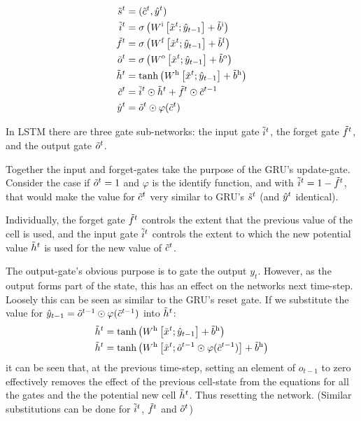 \documentclass[12pt,parskip]{komatufte}
\begin{document}
\begin{align}
\nv s_t &= (\nv c_t, \n \hat{y}_t)\\
%
\nv i_t &= \sigma \left( \d W_i \left[\nv x_t; \hat{y}_{t-1}\right] + \dv b_i \right) \\
\nv f_t &= \sigma \left( \d W_f\left[\nv x_t; \hat{y}_{t-1}\right] + \dv b_f \right) \\
\nv o_t &= \sigma \left( \d W_o\left[\nv x_t; \hat{y}_{t-1}\right] + \dv b_o \right) \\
%
\nv h_t &= \tanh \left( \d W_h\left[\nv x_t; \hat{y}_{t-1}\right] + \dv b_h \right) \\
\nv c_t &=  \nv i_t\odot \nv h_t + \nv f_t \odot \nv c_{t-1} \\
\n \hat{y}_t &= \nv o_t \odot \varphi(\nv c_t)
\end{align}



In LSTM there are three gate sub-networks:
the input gate $\nv i_t$, the forget gate $\nv f_t$, and the output gate $\nv o_t$.

Together the input and forget-gates take the purpose of the GRU's update-gate.
Consider the case if $\nv o_t=1$ and $\varphi$ is the identify function,
and with $\nv i_t=1-\nv f_t$, that would make the value for $\nv c_t$ very similar to GRU's $\nv s_t$ (and $\n \hat{y}_t$ identical).


Individually, the forget gate $\nv f_t$ controls the extent that the previous value of the cell is used,
and the input gate $\nv i_t$ controls the extent to which the new potential value $\nv h_t$ is used for the new value of $\nv c_t$.

The output-gate's obvious purpose is to gate the output $y_t$.
However, as the output forms part of the state,
this has an effect on the networks next time-step.
Loosely this can be seen as similar to the GRU's reset gate.
If we substitute the value for $\hat{y}_{t-1} = \nv o_{t-1} \odot \varphi(\nv c_{t-1})$
into $\nv h_t$:
\begin{align}
\nv h_t &= \tanh \left( \d W_h\left[\nv x_t; \hat{y}_{t-1}\right] + \dv b_h \right) \\
\nv h_t &= \tanh \left( \d W_h\left[\nv x_t;  \nv o_{t-1} \odot \varphi(\nv c_{t-1})\right] + \dv b_h \right) 
\end{align}
it can be seen that, at the previous time-step, setting an element of $o_{t-1}$ to zero effectively removes the effect of the previous cell-state from the equations for all the gates and the the potential new cell $\nv h_t$.
Thus resetting the network.
(Similar substitutions can be done for $\nv i_t$, $\nv f_t$ and $\nv o_t$)
\end{document}
